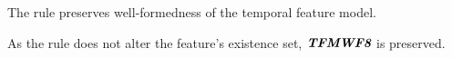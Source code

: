\begin{lemma}
   The  rule preserves well-formedness of the temporal feature model. 
   \label{lemma:move-feature-well-formed}
\end{lemma}

As the rule does not alter the feature's existence set, $\textit{\textbf{TFMWF8}}$ is preserved.
